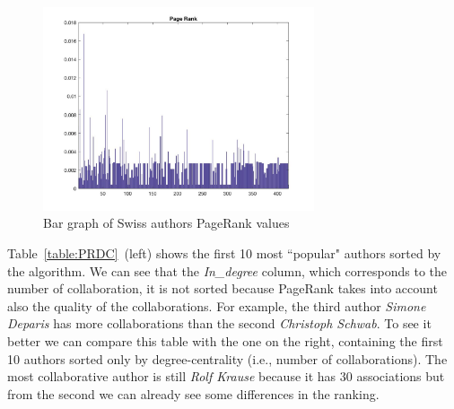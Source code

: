 \documentclass[]{usiinfbachelorproject}
\begin{document}
\begin{figure}[tb]
	\centering
	\includegraphics[height=6cm]{img/Analysis/page_rank_bars.jpg}
	\caption{ Bar graph of Swiss authors PageRank values}
	\label{fig:pagerank_bars}
\end{figure}

Table~\ref{table:PRDC}~(left) shows the first 10 most ``popular" authors sorted by the algorithm.
We can see that the \textit{In\_degree} column, which corresponds to the number of collaboration, it is not sorted because PageRank takes into account also the quality of the collaborations.
For example, the third author \textit{Simone Deparis} has more collaborations than the second \textit{Christoph Schwab}.
To see it better we can compare this table with the one on the right, containing the first 10 authors sorted only by degree-centrality (i.e., number of collaborations). The most collaborative author is still \textit{Rolf Krause} because it has 30 associations but from the second we can already see some differences in the ranking.
\end{document}
